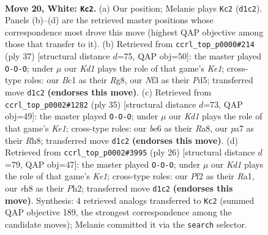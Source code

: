 \documentclass[11pt]{article}
\begin{document}
\clearpage

\begin{figure}[p]\centering
\begin{subfigure}{0.46\textwidth}\centering
\resizebox{\linewidth}{!}{%
\newchessgame
\chessboard[
  setfen={r2k1b1r/pp4pp/2p1b3/q2p1p2/P2P4/1Q2PN1P/1P3PP1/1RBK3R w - - 3 20},
  showmover=false,
  pgfstyle=straightmove, color=movearrow, markmove={d1-c2}
]}
\caption{}
\end{subfigure}\hfill
\begin{subfigure}{0.46\textwidth}\centering
\resizebox{\linewidth}{!}{%
\newchessgame
\chessboard[
  setfen={r3k1r1/1p2qpp1/p1p1p3/3pB1P1/5P1Q/bP1PP2P/P1R5/4K2R b Kq - 0 19},
  showmover=false,
  pgfstyle=straightmove, color=movearrow, markmove={e8-c8}
]}
\caption{}
\end{subfigure}
\\[4pt]
\begin{subfigure}{0.46\textwidth}\centering
\resizebox{\linewidth}{!}{%
\newchessgame
\chessboard[
  setfen={r3k2r/1pq1bp2/p2p1np1/7p/2P2Q2/1N1B1P2/PP4PP/1K1R3R b kq - 0 18},
  showmover=false,
  pgfstyle=straightmove, color=movearrow, markmove={e8-c8}
]}
\caption{}
\end{subfigure}\hfill
\begin{subfigure}{0.46\textwidth}\centering
\resizebox{\linewidth}{!}{%
\newchessgame
\chessboard[
  setfen={rnbq2k1/pp3ppp/2ppr3/8/2P5/1NBQ2P1/PP2PP1P/R3K2R w KQ - 2 14},
  showmover=false,
  pgfstyle=straightmove, color=movearrow, markmove={e1-c1}
]}
\caption{}
\end{subfigure}
\caption{\textbf{Move 20, White: \texttt{Kc2}.} (a) Our position; Melanie plays \texttt{Kc2} (\texttt{d1c2}). Panels (b)--(d) are the retrieved master positions whose correspondence most drove this move (highest QAP objective among those that transfer to it). (b) Retrieved from \texttt{ccrl\_top\_p0000\#214} (ply 37) [structural distance $d$=75, QAP obj=50]: the master played \texttt{O-O-O}; under $\mu$ our \emph{Kd1} plays the role of that game's \emph{Ke1}; cross-type roles: our \emph{B}c1 as their \emph{R}g8, our \emph{N}f3 as their \emph{P}d5; transferred move \texttt{d1c2} \textbf{(endorses this move)}. (c) Retrieved from \texttt{ccrl\_top\_p0002\#1282} (ply 35) [structural distance $d$=73, QAP obj=49]: the master played \texttt{O-O-O}; under $\mu$ our \emph{Kd1} plays the role of that game's \emph{Ke1}; cross-type roles: our \emph{b}e6 as their \emph{R}a8, our \emph{p}a7 as their \emph{R}h8; transferred move \texttt{d1c2} \textbf{(endorses this move)}. (d) Retrieved from \texttt{ccrl\_top\_p0002\#3995} (ply 26) [structural distance $d$=79, QAP obj=47]: the master played \texttt{O-O-O}; under $\mu$ our \emph{Kd1} plays the role of that game's \emph{Ke1}; cross-type roles: our \emph{P}f2 as their \emph{R}a1, our \emph{r}h8 as their \emph{P}h2; transferred move \texttt{d1c2} \textbf{(endorses this move)}. Synthesis: 4 retrieved analogs transferred to \texttt{Kc2} (summed QAP objective 189, the strongest correspondence among the candidate moves); Melanie committed it via the \texttt{search} selector.}
\label{fig:thought-m38}
\end{figure}
\end{document}
